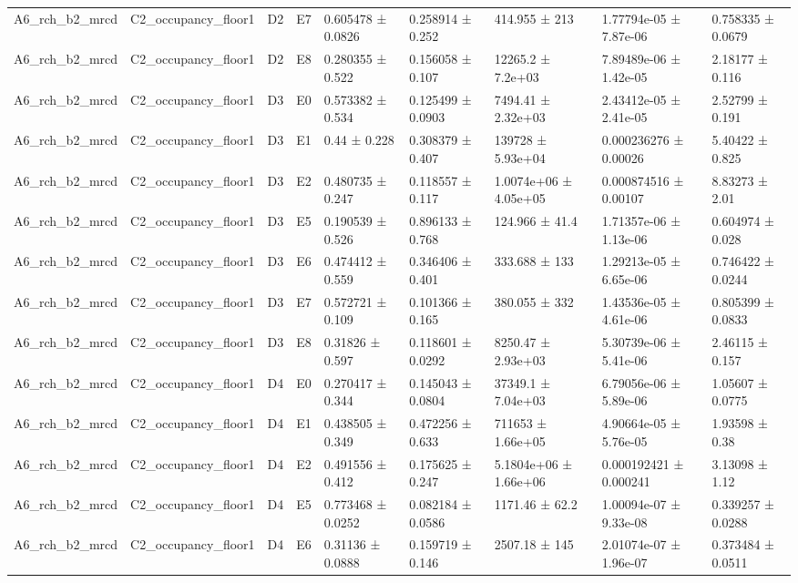 \begin{table}
\begin{tabular}{lllllllll}
A6\_rch\_b2\_mrcd & C2\_occupancy\_floor1 & D2 & E7 & 0.605478 ± 0.0826 & 0.258914 ± 0.252 & 414.955 ± 213 & 1.77794e-05 ± 7.87e-06 & 0.758335 ± 0.0679 \\
A6\_rch\_b2\_mrcd & C2\_occupancy\_floor1 & D2 & E8 & 0.280355 ± 0.522 & 0.156058 ± 0.107 & 12265.2 ± 7.2e+03 & 7.89489e-06 ± 1.42e-05 & 2.18177 ± 0.116 \\
A6\_rch\_b2\_mrcd & C2\_occupancy\_floor1 & D3 & E0 & 0.573382 ± 0.534 & 0.125499 ± 0.0903 & 7494.41 ± 2.32e+03 & 2.43412e-05 ± 2.41e-05 & 2.52799 ± 0.191 \\
A6\_rch\_b2\_mrcd & C2\_occupancy\_floor1 & D3 & E1 & 0.44 ± 0.228 & 0.308379 ± 0.407 & 139728 ± 5.93e+04 & 0.000236276 ± 0.00026 & 5.40422 ± 0.825 \\
A6\_rch\_b2\_mrcd & C2\_occupancy\_floor1 & D3 & E2 & 0.480735 ± 0.247 & 0.118557 ± 0.117 & 1.0074e+06 ± 4.05e+05 & 0.000874516 ± 0.00107 & 8.83273 ± 2.01 \\
A6\_rch\_b2\_mrcd & C2\_occupancy\_floor1 & D3 & E5 & 0.190539 ± 0.526 & 0.896133 ± 0.768 & 124.966 ± 41.4 & 1.71357e-06 ± 1.13e-06 & 0.604974 ± 0.028 \\
A6\_rch\_b2\_mrcd & C2\_occupancy\_floor1 & D3 & E6 & 0.474412 ± 0.559 & 0.346406 ± 0.401 & 333.688 ± 133 & 1.29213e-05 ± 6.65e-06 & 0.746422 ± 0.0244 \\
A6\_rch\_b2\_mrcd & C2\_occupancy\_floor1 & D3 & E7 & 0.572721 ± 0.109 & 0.101366 ± 0.165 & 380.055 ± 332 & 1.43536e-05 ± 4.61e-06 & 0.805399 ± 0.0833 \\
A6\_rch\_b2\_mrcd & C2\_occupancy\_floor1 & D3 & E8 & 0.31826 ± 0.597 & 0.118601 ± 0.0292 & 8250.47 ± 2.93e+03 & 5.30739e-06 ± 5.41e-06 & 2.46115 ± 0.157 \\
A6\_rch\_b2\_mrcd & C2\_occupancy\_floor1 & D4 & E0 & 0.270417 ± 0.344 & 0.145043 ± 0.0804 & 37349.1 ± 7.04e+03 & 6.79056e-06 ± 5.89e-06 & 1.05607 ± 0.0775 \\
A6\_rch\_b2\_mrcd & C2\_occupancy\_floor1 & D4 & E1 & 0.438505 ± 0.349 & 0.472256 ± 0.633 & 711653 ± 1.66e+05 & 4.90664e-05 ± 5.76e-05 & 1.93598 ± 0.38 \\
A6\_rch\_b2\_mrcd & C2\_occupancy\_floor1 & D4 & E2 & 0.491556 ± 0.412 & 0.175625 ± 0.247 & 5.1804e+06 ± 1.66e+06 & 0.000192421 ± 0.000241 & 3.13098 ± 1.12 \\
A6\_rch\_b2\_mrcd & C2\_occupancy\_floor1 & D4 & E5 & 0.773468 ± 0.0252 & 0.082184 ± 0.0586 & 1171.46 ± 62.2 & 1.00094e-07 ± 9.33e-08 & 0.339257 ± 0.0288 \\
A6\_rch\_b2\_mrcd & C2\_occupancy\_floor1 & D4 & E6 & 0.31136 ± 0.0888 & 0.159719 ± 0.146 & 2507.18 ± 145 & 2.01074e-07 ± 1.96e-07 & 0.373484 ± 0.0511 \\

\end{tabular}
\end{table}
